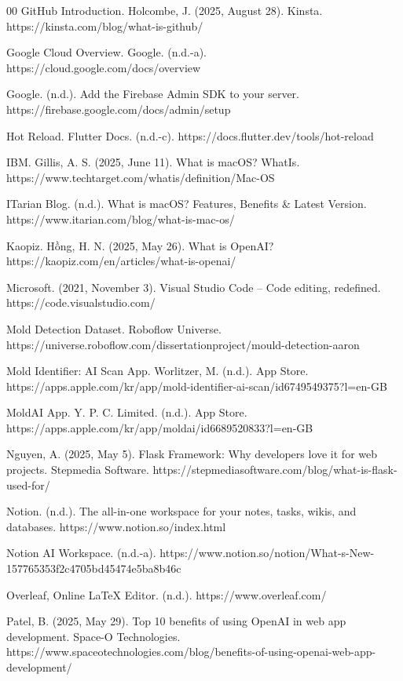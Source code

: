 \documentclass[conference]{IEEEtran}
\begin{document}
\begin{thebibliography}{00}
GitHub Introduction. Holcombe, J. (2025, August 28). Kinsta. https://kinsta.com/blog/what-is-github/

Google Cloud Overview. Google. (n.d.-a). https://cloud.google.com/docs/overview

Google. (n.d.). Add the Firebase Admin SDK to your server. https://firebase.google.com/docs/admin/setup

Hot Reload. Flutter Docs. (n.d.-c). https://docs.flutter.dev/tools/hot-reload

IBM. Gillis, A. S. (2025, June 11). What is macOS? WhatIs. https://www.techtarget.com/whatis/definition/Mac-OS

ITarian Blog. (n.d.). What is macOS? Features, Benefits \& Latest Version. https://www.itarian.com/blog/what-is-mac-os/

Kaopiz. Hồng, H. N. (2025, May 26). What is OpenAI? https://kaopiz.com/en/articles/what-is-openai/

Microsoft. (2021, November 3). Visual Studio Code – Code editing, redefined. https://code.visualstudio.com/

Mold Detection Dataset. Roboflow Universe. https://universe.roboflow.com/dissertationproject/mould-detection-aaron

Mold Identifier: AI Scan App. Worlitzer, M. (n.d.). App Store. https://apps.apple.com/kr/app/mold-identifier-ai-scan/id6749549375?l=en-GB

MoldAI App. Y. P. C. Limited. (n.d.). App Store. https://apps.apple.com/kr/app/moldai/id6689520833?l=en-GB

Nguyen, A. (2025, May 5). Flask Framework: Why developers love it for web projects. Stepmedia Software. https://stepmediasoftware.com/blog/what-is-flask-used-for/

Notion. (n.d.). The all-in-one workspace for your notes, tasks, wikis, and databases. https://www.notion.so/index.html

Notion AI Workspace. (n.d.-a). https://www.notion.so/notion/What-s-New-157765353f2c4705bd45474e5ba8b46c

Overleaf, Online LaTeX Editor. (n.d.). https://www.overleaf.com/

Patel, B. (2025, May 29). Top 10 benefits of using OpenAI in web app development. Space-O Technologies. https://www.spaceotechnologies.com/blog/benefits-of-using-openai-web-app-development/


\end{thebibliography}
\end{document}
